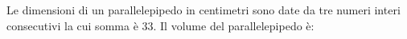 Le dimensioni di un parallelepipedo in centimetri sono date 
da tre numeri interi consecutivi la cui somma \`e 33. 
Il volume del parallelepipedo \`e: